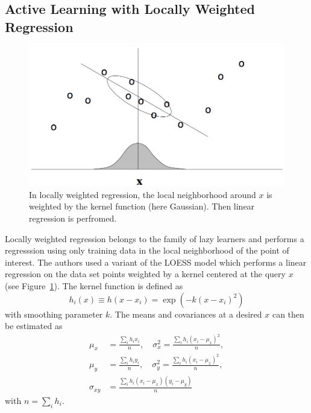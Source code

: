 \documentclass{article}
\begin{document}
\subsection{Active Learning with Locally Weighted Regression}
\begin{figure}\centering
  \includegraphics[width=1.0\columnwidth,keepaspectratio]{../pics/LWR.png}
  \caption{In locally weighted regression, the local neighborhood around $x$ is
  weighted by the kernel function (here Gaussian).
  Then linear regression is perfromed.}
  \label{fig:lwr}
\end{figure}
Locally weighted regression belongs to the family of lazy learners and
performs a regresssion using only training data in the local neighborhood
of the point of interest. The authors used a variant of the LOESS model
\cite{cleveland1988locally} which performs a linear regression on the
data set points weighted by a kernel centered at the query $x$
(see Figure~\ref{fig:lwr}). The kernel function is defined as
\begin{equation}
h_i(x) \equiv h(x-x_i) = \exp(-k(x-x_i)^2)
\end{equation}
with smoothing parameter $k$. The means and covariances at a desired $x$ can
then be estimated as
\begin{equation}\begin{split}
  \mu_x &= \frac{\sum_i h_ix_i}{n}, \quad
  \sigma_x^2 = \frac{\sum_i h_i(x_i-\mu_x)^2}{n}, \\
  \mu_y &= \frac{\sum_i h_iy_i}{n}, \quad
  \sigma_y^2 = \frac{\sum_i h_i(x_i-\mu_x)^2}{n}, \\
  \sigma_{xy} &= \frac{\sum_i h_i(x_i-\mu_x)(y_i-\mu_y)}{n}
\end{split}\end{equation}
with $n = \sum_i h_i$.
\end{document}
